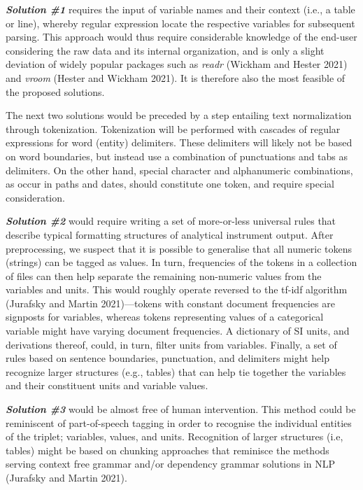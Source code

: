 \documentclass[]{article}
\begin{document}
\textbf{\emph{Solution \#1}} requires the input of variable names and their context (i.e., a table or line), whereby regular expression locate the respective variables for subsequent parsing. This approach would thus require considerable knowledge of the end-user considering the raw data and its internal organization, and is only a slight deviation of widely popular packages such as \emph{readr} (Wickham and Hester 2021) and \emph{vroom} (Hester and Wickham 2021). It is therefore also the most feasible of the proposed solutions.

The next two solutions would be preceded by a step entailing text normalization through tokenization. Tokenization will be performed with cascades of regular expressions for word (entity) delimiters. These delimiters will likely not be based on word boundaries, but instead use a combination of punctuations and tabs as delimiters. On the other hand, special character and alphanumeric combinations, as occur in paths and dates, should constitute one token, and require special consideration.

\textbf{\emph{Solution \#2}} would require writing a set of more-or-less universal rules that describe typical formatting structures of analytical instrument output. After preprocessing, we suspect that it is possible to generalise that all numeric tokens (strings) can be tagged as values. In turn, frequencies of the tokens in a collection of files can then help separate the remaining non-numeric values from the variables and units. This would roughly operate reversed to the tf-idf algorithm (Jurafsky and Martin 2021)---tokens with constant document frequencies are signposts for variables, whereas tokens representing values of a categorical variable might have varying document frequencies. A dictionary of SI units, and derivations thereof, could, in turn, filter units from variables. Finally, a set of rules based on sentence boundaries, punctuation, and delimiters might help recognize larger structures (e.g., tables) that can help tie together the variables and their constituent units and variable values.

\textbf{\emph{Solution \#3}} would be almost free of human intervention. This method could be reminiscent of part-of-speech tagging in order to recognise the individual entities of the triplet; variables, values, and units. Recognition of larger structures (i.e, tables) might be based on chunking approaches that reminisce the methods serving context free grammar and/or dependency grammar solutions in NLP (Jurafsky and Martin 2021).
\end{document}
